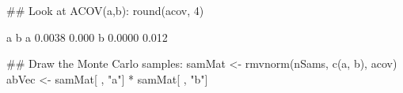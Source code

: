 \begin{Schunk}
\begin{Sinput}
 ## Look at ACOV(a,b):
 round(acov, 4)
\end{Sinput}
\begin{Soutput}
       a     b
a 0.0038 0.000
b 0.0000 0.012
\end{Soutput}
\begin{Sinput}
 ## Draw the Monte Carlo samples:
 samMat <- rmvnorm(nSams, c(a, b), acov)
 abVec <- samMat[ , "a"] * samMat[ , "b"]
\end{Sinput}
\end{Schunk}
